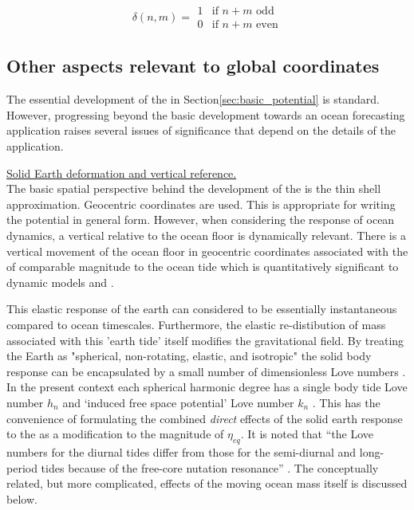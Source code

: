 \begin{equation}
\delta(n,m)  =     \begin{array}{ll}
                    1 & \mbox{if $n+m$ odd}  \\
                    0 & \mbox{if $n+m$ even} 
                    \end{array}             
\end{equation}


\subsection{Other aspects relevant to global coordinates}
\label{S:ATGP_extras}
The essential development of the \ATGP{} in Section\ref{sec:basic_potential} is standard.  However, progressing beyond the basic development towards an ocean forecasting application raises several issues of significance that depend on the details of the application.


\underline{Solid Earth deformation and vertical reference.}  \\
The basic spatial perspective behind the development of the \ATGP{} is the thin shell approximation.  Geocentric coordinates are used.  This is appropriate for writing the potential in general form.  However, when considering the response of ocean dynamics, a vertical relative to the ocean floor is dynamically relevant.  There is a vertical movement of the ocean floor in geocentric coordinates associated with the \ATGP{} of comparable magnitude to the ocean tide which is quantitatively significant to dynamic models \citep{Hendershott:1981ub} and \citep[pp.336]{gill1982atmosphere}.


This elastic response of the earth can considered to be essentially instantaneous compared to ocean timescales.  Furthermore, the elastic re-distibution of mass associated with this 'earth tide' itself modifies the gravitational field.    By treating the Earth as "spherical, non-rotating, elastic, and isotropic" the solid body response can be encapsulated by a small number of dimensionless Love numbers \citep{10.1016/b978-0-444-53802-4.00058-0}.  In the present context each spherical harmonic degree has a single body tide Love number $h_n$ and `induced free space potential' Love number $k_n$ \citep[Sec 5.3.3]{Urban:2013vl}. This has the convenience of formulating the combined \emph{direct} effects of the solid earth response to the \ATGP{} as a modification to the magnitude of $\eta_{eq}$.  It is noted that ``the Love numbers for the diurnal tides differ from those for the semi-diurnal and long-period tides because of the free-core nutation resonance'' \citep{Arbic:2004wz}.
The conceptually related, but more complicated, effects of the moving ocean mass itself is discussed below.


